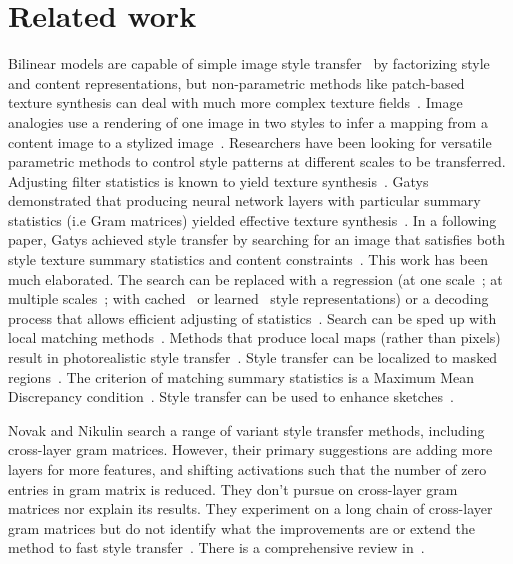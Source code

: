 \documentclass[runningheads]{llncs}
\begin{document}
\section{Related work}
Bilinear models are capable of simple image style transfer~\cite{Tenenbaum2000} by factorizing style and content representations, but non-parametric methods like patch-based texture synthesis can deal with much more complex texture fields~\cite{Efros2001}.  Image analogies
use a rendering of one image in two styles to infer a mapping from a content image to a stylized
image~\cite{Hertzmann2001}. Researchers have been looking for versatile parametric methods to control style patterns at
different scales to be transferred. Adjusting filter statistics is known to yield texture
synthesis~\cite{debonet,simoncelli}.  Gatys \ea demonstrated that producing neural network layers with particular
summary statistics (i.e Gram matrices) yielded effective texture synthesis~\cite{NIPS2015_5633}. In a following paper,
Gatys \ea achieved style transfer by searching for an image that satisfies both style texture summary statistics and
content constraints~\cite{gatys2016image}. This work has been much elaborated. The search can be replaced with a
regression (at one scale~\cite{Johnson2016Perceptual}; at multiple scales~\cite{wang2016multimodal}; with
cached~\cite{chen2017stylebank} or learned~\cite{dumoulin2016learned} style representations) or a decoding process that
allows efficient adjusting of statistics~\cite{UST}. Search can be sped up with local matching
methods~\cite{chen2016fast}. Methods that produce local maps (rather than pixels) result in photorealistic style
transfer~\cite{Shih2014,Luan2017}. Style transfer can be localized to masked regions~\cite{gatys2016controlling}. The
criterion of matching summary statistics is a Maximum Mean Discrepancy condition~\cite{li2017demystifying}. Style
transfer can be used to enhance sketches~\cite{champandard2016semantic}.  

Novak and Nikulin search a range of variant style transfer methods, including cross-layer gram matrices. However, their
primary suggestions are adding more layers for more features, and shifting activations such that the number of zero
entries in gram matrix is reduced. They don't pursue on cross-layer gram matrices nor explain its results. They
experiment on a long chain of cross-layer gram matrices but do not identify what the improvements are or extend the
method to fast style transfer~\cite{novak2016improving}.  There is a comprehensive review in~\cite{jing2017neural}. 
\end{document}
